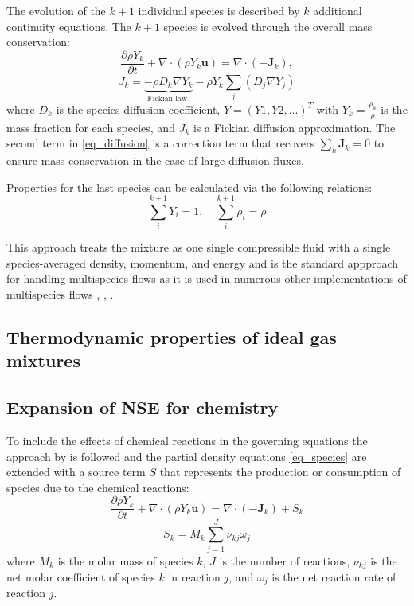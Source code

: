 The evolution of the $k+1$ individual species is described by $k$ additional continuity equations. The $k+1$ species is evolved through the overall mass conservation:
\begin{equation} \label{eq_species}
\frac{\partial \rho Y_k}{\partial t}+\nabla \cdot\left(\rho Y_k \boldsymbol{u}\right)=\nabla \cdot\left(-\boldsymbol{J}_k\right),
\end{equation}
\begin{equation}\label{eq_diffusion}
 J_k=\underbrace{-\rho D_k \nabla Y_k}_{\text {Fickian law }}-\rho Y_k \sum_j\left(D_j \nabla Y_j\right) 
\end{equation}
where $D_k$ is the species diffusion coefficient, $Y = (Y1,  Y2, . . .)^T$ with $Y_k = \frac{\rho _k}{\rho}$  is the mass fraction for each species, and $J_k$ is a Fickian diffusion approximation. The second term in \ref{eq_diffusion} is a correction term that recovers $\sum_k \boldsymbol{J}_k=0$ to ensure mass conservation in the case of large diffusion fluxes. 

Properties for the last species can be calculated via the following relations:
\begin{equation}
    \sum_i^{k+1} Y_i=1, \quad \sum_i^{k+1} \rho_i=\rho
\end{equation}

This approach treats the mixture as one single compressible fluid with a single species-averaged density, momentum, and energy and is the standard appproach for handling multispecies flows as it is used in numerous other implementations of multispecies flows \cite{fedkiwHighAccuracyNumerical1997} , \cite{keeChemicallyReactingFlow2003}, \cite{lvDiscontinuousGalerkinMethod2014}. 

\subsection{Thermodynamic properties of ideal gas mixtures}
\subsection{Expansion of NSE for chemistry}
To include the effects of chemical reactions in the governing equations the approach by \cite{fedkiwHighAccuracyNumerical1997} is followed and the partial density equations \ref{eq_species} are extended with a source term $S$ that represents the production or consumption of species due to the chemical reactions:
\begin{equation} \label{eq_species_chem}
    \frac{\partial \rho Y_k}{\partial t}+\nabla \cdot\left(\rho Y_k \boldsymbol{u}\right)=\nabla \cdot\left(-\boldsymbol{J}_k\right)+S_k
    \end{equation}
    \begin{equation}
    S_k=M_k \sum_{j=1}^{J} \nu_{k j} \omega_j
\end{equation}
where $M_k$ is the molar mass of species $k$, $J$ is the number of reactions, $\nu_{k j}$ is the net molar coefficient of species $k$ in reaction $j$, and $\omega_j$ is the net reaction rate of reaction $j$.

